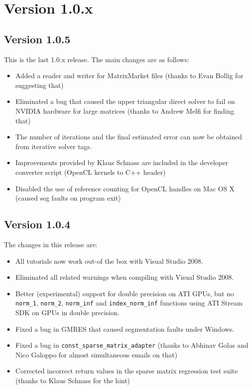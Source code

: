 \section*{Version 1.0.x}

\subsection*{Version 1.0.5}
This is the last 1.0.x release. The main changes are as follows:
\begin{itemize}
 \item Added a reader and writer for MatrixMarket files (thanks to Evan Bollig for suggesting that)
 \item Eliminated a bug that caused the upper triangular direct solver to fail on NVIDIA hardware for large matrices (thanks to Andrew Melfi for finding that)
 \item The number of iterations and the final estimated error can now be obtained from iterative solver tags.
 \item Improvements provided by Klaus Schnass are included in the developer converter script (OpenCL kernels to C++ header)
 \item Disabled the use of reference counting for OpenCL handles on Mac OS X (caused seg faults on program exit)
\end{itemize}

\subsection*{Version 1.0.4}
The changes in this release are:
\begin{itemize}
 \item All tutorials now work out-of the box with Visual Studio 2008.
 \item Eliminated all {\ViennaCL} related warnings when compiling with Visual Studio 2008.
 \item Better (experimental) support for double precision on ATI GPUs, but no \texttt{norm\_1}, \texttt{norm\_2}, \texttt{norm\_inf} and \texttt{index\_norm\_inf} functions using ATI Stream SDK on GPUs in double precision.
 \item Fixed a bug in GMRES that caused segmentation faults under Windows.
 \item Fixed a bug in \texttt{const\_sparse\_matrix\_adapter} (thanks to Abhinav Golas and Nico Galoppo for almost simultaneous emails on that)
 \item Corrected incorrect return values in the sparse matrix regression test suite (thanks to Klaus Schnass for the hint)
\end{itemize}


